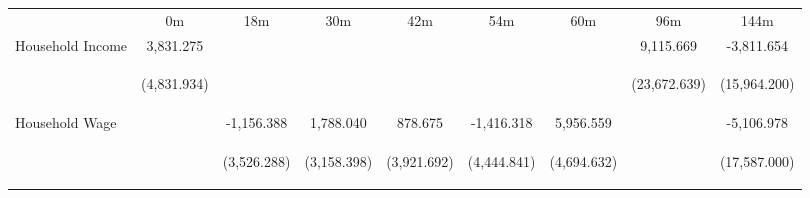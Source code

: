 \begin{tabular}{lcccccccc}
\hline \noalign{\smallskip} & 0m & 18m & 30m & 42m & 54m & 60m & 96m & 144m\\
\noalign{\smallskip}\hline \noalign{\smallskip}Household Income & 3,831.275 &  &  &  &  &  & 9,115.669 & -3,811.654\\
 & \begin{footnotesize}(4,831.934)\end{footnotesize} & \begin{footnotesize}\end{footnotesize} & \begin{footnotesize}\end{footnotesize} & \begin{footnotesize}\end{footnotesize} & \begin{footnotesize}\end{footnotesize} & \begin{footnotesize}\end{footnotesize} & \begin{footnotesize}(23,672.639)\end{footnotesize} & \begin{footnotesize}(15,964.200)\end{footnotesize}\\
\noalign{\smallskip}Household Wage &  & -1,156.388 & 1,788.040 & 878.675 & -1,416.318 & 5,956.559 &  & -5,106.978\\
 & \begin{footnotesize}\end{footnotesize} & \begin{footnotesize}(3,526.288)\end{footnotesize} & \begin{footnotesize}(3,158.398)\end{footnotesize} & \begin{footnotesize}(3,921.692)\end{footnotesize} & \begin{footnotesize}(4,444.841)\end{footnotesize} & \begin{footnotesize}(4,694.632)\end{footnotesize} & \begin{footnotesize}\end{footnotesize} & \begin{footnotesize}(17,587.000)\end{footnotesize}\\

\end{tabular}
